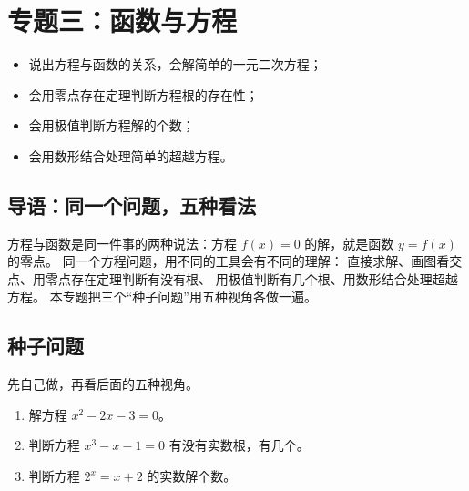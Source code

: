 \section{专题三：函数与方程}

\begin{learnobjective}
\begin{itemize}
  \item 说出方程与函数的关系，会解简单的一元二次方程；
  \item 会用零点存在定理判断方程根的存在性；
  \item 会用极值判断方程解的个数；
  \item 会用数形结合处理简单的超越方程。
\end{itemize}
\end{learnobjective}

\begin{preview}
\subsection{导语：同一个问题，五种看法}
方程与函数是同一件事的两种说法：方程 $f(x)=0$ 的解，就是函数 $y=f(x)$ 的零点。
同一个方程问题，用不同的工具会有不同的理解：
直接求解、画图看交点、用零点存在定理判断有没有根、
用极值判断有几个根、用数形结合处理超越方程。
本专题把三个“种子问题”用五种视角各做一遍。

\subsection{种子问题}
先自己做，再看后面的五种视角。
\begin{enumerate}
  \item 解方程 $x^2-2x-3=0$。
  \item 判断方程 $x^3-x-1=0$ 有没有实数根，有几个。
  \item 判断方程 $2^x=x+2$ 的实数解个数。
\end{enumerate}
\end{preview}

